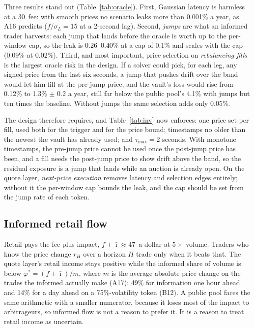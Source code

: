 Three results stand out (Table~\ref{tab:oracle}). First, Gaussian latency is harmless at a 30\bps\ fee: with smooth prices no scenario leaks more than 0.001\% a year, as A16 predicts ($f/\sigma_L=15$ at a 2-second lag). Second, \emph{jumps} are what an informed trader harvests: each jump that lands before the oracle is worth up to the per-window cap, so the leak is 0.26--0.40\% at a cap of 0.1\% and scales with the cap (0.09\% at 0.02\%). Third, and most important, price selection on \emph{rebalancing fills} is the largest oracle risk in the design. If a solver could pick, for each leg, any signed price from the last six seconds, a jump that pushes drift over the band would let him fill at the pre-jump price, and the vault's loss would rise from 0.12\% to 1.3\% $\pm$ 0.2 a year, still far below the public pool's 4.1\% with jumps but ten times the baseline. Without jumps the same selection adds only 0.05\%.

The design therefore requires, and Table~\ref{tab:inv} now enforces: one price set per fill, used both for the trigger and for the price bound; timestamps no older than the newest the vault has already used; and $\tau_{\max}=2$ seconds. With monotone timestamps, the pre-jump price cannot be used once the post-jump price has been, and a fill needs the post-jump price to show drift above the band, so the residual exposure is a jump that lands while an auction is already open. On the quote layer, \emph{next-price execution} removes latency and selection edges entirely; without it the per-window cap bounds the leak, and the cap should be set from the jump rate of each token.

\subsection{Informed retail flow}
Retail pays the fee plus impact, $f+\bar\imath\approx47$\bps\ a dollar at $5\times$ volume. Traders who know the price change $r_H$ over a horizon $H$ trade only when it beats that. The quote layer's retail income stays positive while the informed share of volume is below $\varphi^{*}=(f+\bar\imath)/m$, where $m$ is the average absolute price change on the trades the informed actually make (A17): 49\% for information one hour ahead and 14\% for a day ahead on a 75\%-volatility token (B12). A public pool faces the same arithmetic with a smaller numerator, because it loses most of the impact to arbitrageurs, so informed flow is not a reason to prefer it. It is a reason to treat retail income as uncertain.

